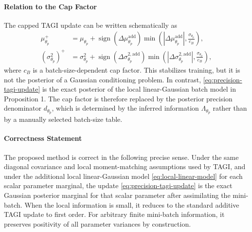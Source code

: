 \documentclass[11pt]{article}
\begin{document}
\paragraph{Relation to the Cap Factor}
The capped TAGI update can be written schematically as
\begin{equation}
\begin{aligned}
    \mu_{\theta_p}^{+}
    &=
    \mu_{\theta_p}
    +
    \operatorname{sign}(\Delta\mu_{\theta_p}^{\mathrm{add}})
    \min\left(
    |\Delta\mu_{\theta_p}^{\mathrm{add}}|,
    \frac{\sigma_{\theta_p}}{c_B}
    \right),
    \\
    (\sigma^2_{\theta_p})^{+}
    &=
    \sigma^2_{\theta_p}
    +
    \operatorname{sign}(\Delta\sigma_{\theta_p}^{2,\mathrm{add}})
    \min\left(
    |\Delta\sigma_{\theta_p}^{2,\mathrm{add}}|,
    \frac{\sigma_{\theta_p}}{c_B}
    \right),
\end{aligned}
\label{eq:capped-update}
\end{equation}
where
\(
c_B
\)
is a batch-size-dependent cap factor. This stabilizes training, but it is not
the posterior of a Gaussian conditioning problem. In contrast,
\eqref{eq:precision-tagi-update} is the exact posterior of the local
linear-Gaussian batch model in Proposition 1. The cap factor is therefore
replaced by the posterior precision denominator
\(
d_{\theta_p}
\),
which is determined by the inferred information
\(
\Lambda_{\theta_p}
\)
rather than by a manually selected batch-size table.

\paragraph{Correctness Statement}
The proposed method is correct in the following precise sense. Under the same
diagonal covariance and local moment-matching assumptions used by TAGI, and
under the additional local linear-Gaussian model
\eqref{eq:local-linear-model} for each scalar parameter marginal, the update
\eqref{eq:precision-tagi-update} is the exact Gaussian posterior marginal for
that scalar parameter after assimilating the mini-batch. When the local
information is small, it reduces to the standard additive TAGI update to first
order. For arbitrary finite mini-batch information, it preserves positivity of
all parameter variances by construction.
\end{document}
